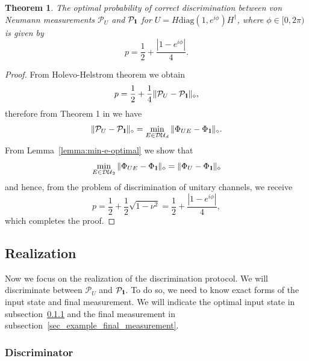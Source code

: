 \documentclass[preprint,12pt, a4paper]{elsarticle}
\newcommand{\1}{{\rm 1\hspace{-0.9mm}l}}
\newcommand{\Id}{{\rm 1\hspace{-0.9mm}l}}
\newcommand{\PP}{\mathcal{P}}
\newcommand{\diaguni}{\ensuremath{\mathcal{DU}}}
\newcommand{\diag}{\mathrm{diag}}
\newtheorem{theorem}{Theorem}
\begin{document}
\begin{theorem}
The optimal probability of correct discrimination between von Neumann
measurements $\PP_U$ and $\PP_{\Id}$ for $U = H \diag(1, e^{i \phi}) H^\dagger$,
where $\phi \in [0, 2\pi)$ is given by
\begin{equation}
p = \frac{1}{2} + \frac{|1 - e^{i \phi}  |}{4} . 
\end{equation}
\end{theorem}
\begin{proof}
	From Holevo-Helstrom theorem we obtain
	\begin{equation}
	p = \frac{1}{2} + \frac{1}{4} \| \PP_{U} - \PP_{\Id} \|_\diamond,
	\end{equation}
	therefore from Theorem 1 in \cite{puchala2018strategies} we have 
	\begin{equation}
	\|\PP_U - \PP_\Id\|_\diamond = \min_{E \in \diaguni_d} \|\Phi_{UE} - 
	\Phi_\Id\|_\diamond. 
	\end{equation}
	From Lemma~\ref{lemma:min-e-optimal} we show that 
	\begin{equation}
		\min_{E \in \diaguni_2} \|\Phi_{UE} - 
	\Phi_\Id\|_\diamond = \|\Phi_{U} - 
	\Phi_\Id\|_\diamond
	\end{equation} and hence, from the problem of discrimination of unitary channels, we receive 
	\begin{equation}
	p = \frac{1}{2} + \frac{1}{2} \sqrt{1 - \nu^2} = \frac{1}{2} + \frac{|1-e^{i \phi}|}{4},
	\end{equation} which completes the proof.
\end{proof}




\subsection{Realization}\label{sec:example_realization}
Now we focus on the realization of the discrimination protocol. We will 
discriminate between $\PP_U$ and $\PP_\1$. To do so, we need to know exact 
forms of the input state and final measurement. We will indicate the optimal 
input state in subsection~\ref{sec:example_discriminator} and the final 
measurement in subsection~\ref{sec_example_final_measurement}.


\subsubsection{Discriminator}\label{sec:example_discriminator}
\end{document}
